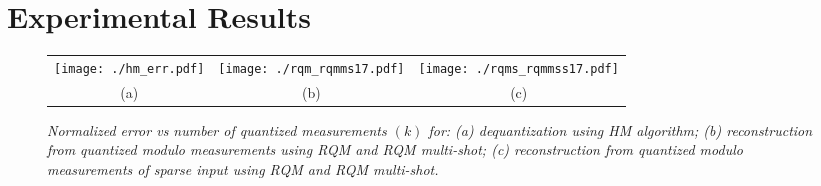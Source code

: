 




\section{Experimental Results}
\label{sec:Results}
\begin{figure*}[t]
	\begin{center}
		\begingroup
		\setlength{\tabcolsep}{1pt} %
		\renewcommand{\arraystretch}{.1} %
		\begin{tabular}{ccc}      %
			\texttt{[image: ./hm\_err.pdf]}&
			\texttt{[image: ./rqm\_rqmms17.pdf]}&
			\texttt{[image: ./rqms\_rqmmss17.pdf]}
			\\
			(a) & (b) & (c)
		\end{tabular}
		\endgroup
	\end{center}
	\caption{\emph{ Normalized error vs number of quantized measurements $(k)$ for: (a) dequantization using HM algorithm; (b) reconstruction from quantized modulo measurements using RQM and RQM multi-shot; (c) reconstruction from quantized modulo measurements of sparse input using RQM and RQM multi-shot.}}
	\label{fig:results}
\end{figure*}


